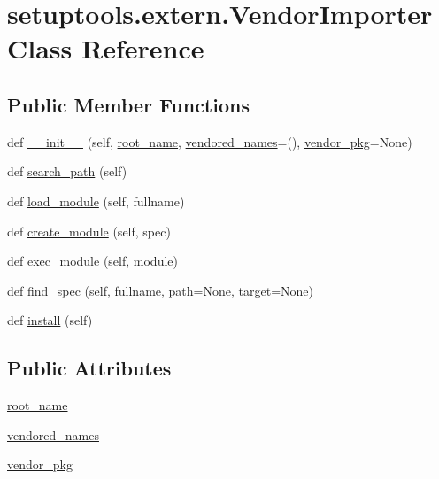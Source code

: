 \hypertarget{classsetuptools_1_1extern_1_1VendorImporter}{}\section{setuptools.\+extern.\+Vendor\+Importer Class Reference}
\label{classsetuptools_1_1extern_1_1VendorImporter}
\subsection*{Public Member Functions}
\begin{DoxyCompactItemize}
\item 
def \hyperlink{classsetuptools_1_1extern_1_1VendorImporter_ab953e7ca460c58697e63e6b0f9cab962}{\+\_\+\+\_\+init\+\_\+\+\_\+} (self, \hyperlink{classsetuptools_1_1extern_1_1VendorImporter_a2379abed53dd5125c6c01a7a05724f68}{root\+\_\+name}, \hyperlink{classsetuptools_1_1extern_1_1VendorImporter_a3bd8e09ceee0dc10cef5fd6db8c2e877}{vendored\+\_\+names}=(), \hyperlink{classsetuptools_1_1extern_1_1VendorImporter_a438c2bf15940a2d1ceb84510bf8de36d}{vendor\+\_\+pkg}=None)
\item 
def \hyperlink{classsetuptools_1_1extern_1_1VendorImporter_ad443f2f83ec349be9f556dd6cb0602a0}{search\+\_\+path} (self)
\item 
def \hyperlink{classsetuptools_1_1extern_1_1VendorImporter_a1d782aed41c8f30932f3be255f1f9b37}{load\+\_\+module} (self, fullname)
\item 
def \hyperlink{classsetuptools_1_1extern_1_1VendorImporter_ae29d486a9e58c465eb3bd6c8689df3f3}{create\+\_\+module} (self, spec)
\item 
def \hyperlink{classsetuptools_1_1extern_1_1VendorImporter_a8660f35bec3a0b443abfc6ad9ccc8899}{exec\+\_\+module} (self, module)
\item 
def \hyperlink{classsetuptools_1_1extern_1_1VendorImporter_a237080eb766f312513cbfd6951b9b1be}{find\+\_\+spec} (self, fullname, path=None, target=None)
\item 
def \hyperlink{classsetuptools_1_1extern_1_1VendorImporter_ac222230d5bb07d63d2749d23578015b1}{install} (self)
\end{DoxyCompactItemize}
\subsection*{Public Attributes}
\begin{DoxyCompactItemize}
\item 
\hyperlink{classsetuptools_1_1extern_1_1VendorImporter_a2379abed53dd5125c6c01a7a05724f68}{root\+\_\+name}
\item 
\hyperlink{classsetuptools_1_1extern_1_1VendorImporter_a3bd8e09ceee0dc10cef5fd6db8c2e877}{vendored\+\_\+names}
\item 
\hyperlink{classsetuptools_1_1extern_1_1VendorImporter_a438c2bf15940a2d1ceb84510bf8de36d}{vendor\+\_\+pkg}
\end{DoxyCompactItemize}



